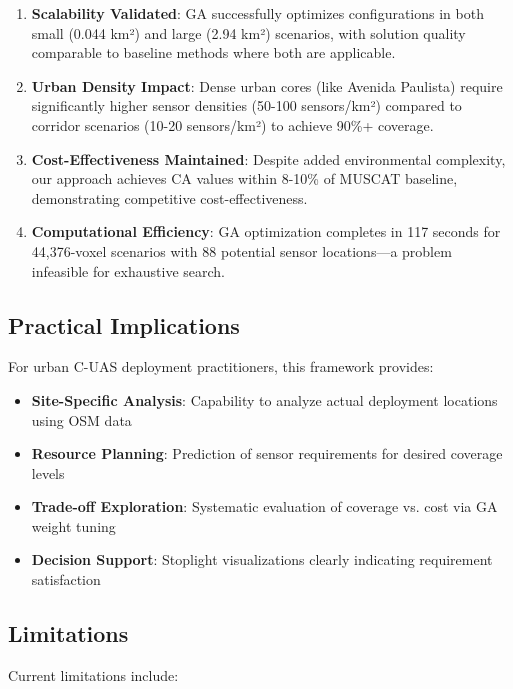 \begin{enumerate}
\item \textbf{Scalability Validated}: GA successfully optimizes configurations in both small (0.044 km²) and large (2.94 km²) scenarios, with solution quality comparable to baseline methods where both are applicable.

\item \textbf{Urban Density Impact}: Dense urban cores (like Avenida Paulista) require significantly higher sensor densities (50-100 sensors/km²) compared to corridor scenarios (10-20 sensors/km²) to achieve 90\%+ coverage.

\item \textbf{Cost-Effectiveness Maintained}: Despite added environmental complexity, our approach achieves CA values within 8-10\% of MUSCAT baseline, demonstrating competitive cost-effectiveness.

\item \textbf{Computational Efficiency}: GA optimization completes in 117 seconds for 44,376-voxel scenarios with 88 potential sensor locations—a problem infeasible for exhaustive search.
\end{enumerate}

\subsection{Practical Implications}

For urban C-UAS deployment practitioners, this framework provides:

\begin{itemize}
\item \textbf{Site-Specific Analysis}: Capability to analyze actual deployment locations using OSM data
\item \textbf{Resource Planning}: Prediction of sensor requirements for desired coverage levels
\item \textbf{Trade-off Exploration}: Systematic evaluation of coverage vs. cost via GA weight tuning
\item \textbf{Decision Support}: Stoplight visualizations clearly indicating requirement satisfaction
\end{itemize}

\subsection{Limitations}

Current limitations include:

